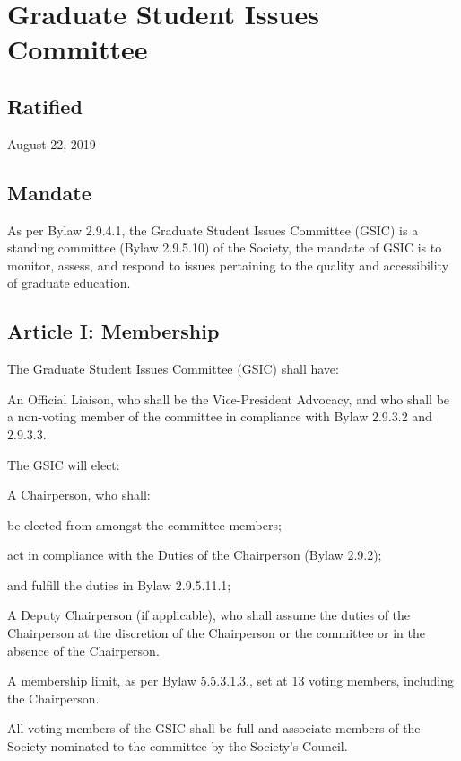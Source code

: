 \section{Graduate Student Issues Committee}

\subsection{Ratified}
August 22, 2019

\subsection{Mandate}
As per Bylaw 2.9.4.1, the Graduate Student Issues Committee (GSIC) is a standing committee (Bylaw 2.9.5.10) of the Society, the mandate of GSIC is to monitor, assess, and respond to issues pertaining to the quality and accessibility of graduate education.

\subsection{Article I: Membership}
\begin{longenum}[ label*=\thesubsection.\arabic*., align=left] 
\item The Graduate Student Issues Committee (GSIC) shall have:
	\begin{longenum}[ label*=\arabic*., align=left]
	\item An Official Liaison, who shall be the Vice-President Advocacy, and who shall be a non-voting member of the committee in compliance with Bylaw 2.9.3.2 and 2.9.3.3.
	\end{longenum}
\item The GSIC will elect:
	\begin{longenum}[ label*=\arabic*., align=left]
	\item A Chairperson, who shall:
		\begin{longenum}[ label*=\arabic*., align=left]
		\item be elected from amongst the committee members;
		\item act in compliance with the Duties of the Chairperson (Bylaw 2.9.2);
		\item and fulfill the duties in Bylaw 2.9.5.11.1;
		\end{longenum}
	\item A Deputy Chairperson (if applicable), who shall assume the duties of the Chairperson at the discretion of the Chairperson or the committee or in the absence of the Chairperson.
	\end{longenum}
\item A membership limit, as per Bylaw 5.5.3.1.3., set at 13 voting members, including the Chairperson.
\item All voting members of the GSIC shall be full and associate members of the Society nominated to the committee by the Society’s Council.
\end{longenum}

